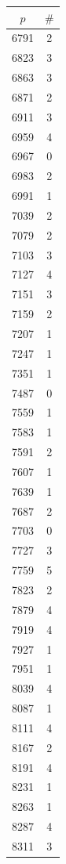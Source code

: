 \documentclass[10pt,a4paper]{amsart}
\begin{document}
\begin{table}[htbp]
\begin{minipage}{0.135\textwidth}
    \begin{tabular}{c|c}
        $p$ & $\#$ \\ \hline
        6791 & 2 \\
        6823 & 3 \\
        6863 & 3 \\
        6871 & 2 \\
        6911 & 3 \\
        6959 & 4 \\
        6967 & 0 \\
        6983 & 2 \\
        6991 & 1 \\
        7039 & 2 \\
        7079 & 2 \\
        7103 & 3 \\
        7127 & 4 \\
        7151 & 3 \\
        7159 & 2 \\
        7207 & 1 \\
        7247 & 1 \\
        7351 & 1 \\
        7487 & 0 \\
        7559 & 1 \\
        7583 & 1 \\
        7591 & 2 \\
        7607 & 1 \\
        7639 & 1 \\
        7687 & 2 \\
        7703 & 0 \\
        7727 & 3 \\
        7759 & 5 \\
        7823 & 2 \\
        7879 & 4 \\
        7919 & 4 \\
        7927 & 1 \\
        7951 & 1 \\
        8039 & 4 \\
        8087 & 1 \\
        8111 & 4 \\
        8167 & 2 \\
        8191 & 4 \\
        8231 & 1 \\
        8263 & 1 \\
        8287 & 4 \\
        8311 & 3 \\

\end{tabular}
\end{minipage}
\end{table}
\end{document}
